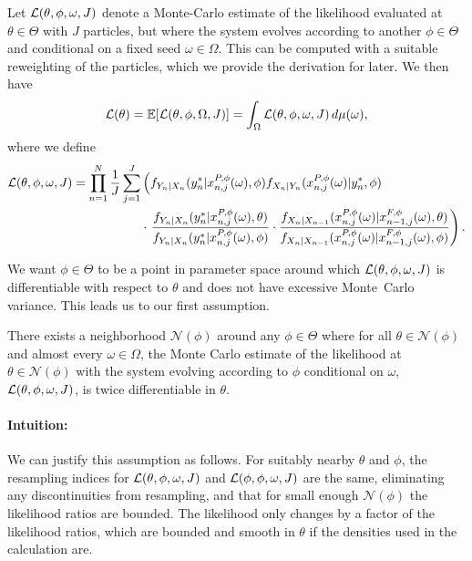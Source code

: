 \documentclass{article}
\begin{document}
\begin{defn}
\label{defn:doubly-off-policy}
Let $\mathcal{L}(\theta, \phi, \omega, J)$ denote a Monte-Carlo estimate of the likelihood evaluated at $\theta \in \Theta$ with $J$ particles, but where the system evolves according to another $\phi \in \Theta$ and conditional on a fixed seed $\omega \in \Omega$. This can be computed with a suitable reweighting of the particles, which we provide the derivation for later. We then have
\begin{equation} \label{eq:loglik2}
\mathcal{L}(\theta)=\mathbb{E}[\mathcal{L}(\theta,\phi,\Omega, J)]=\int_\Omega \mathcal{L}(\theta,\phi,\omega, J)\, d\mu(\omega),
\end{equation}
where we define
\begin{align}
    \mathcal{L}(\theta,\phi,\omega, J) = \prod_{n=1}^N \frac{1}{J} \sum_{j=1}^J &\left(f_{Y_n|X_n}(y_n^* | x_{n,j}^{P,\phi}(\omega), \phi) f_{X_n|Y_n}(x_{n,j}^{P, \phi}(\omega) | y_n^*, \phi) \right.\\
    &\cdot
    \left.
    \frac{f_{Y_n|X_n}(y^*_n|x_{n,j}^{P,\phi}(\omega),\theta)}{f_{Y_n|X_n}(y^*_n|x_{n,j}^{P,\phi}(\omega),\phi)}
    \cdot \frac{f_{X_n|X_{n-1}}(x_{n,j}^{P,\phi}(\omega)|x_{n-1,j}^{F,\phi}(\omega),\theta)}{f_{X_n|X_{n-1}}(x_{n,j}^{P,\phi}(\omega)|x_{n-1,j}^{F,\phi}(\omega),\phi)}\right).
\end{align}
\end{defn}

We want $\phi\in\Theta$ to be a point in parameter space around which $\mathcal{L}(\theta,\phi,\omega, J)$ is differentiable with respect to $\theta$ and does not have excessive Monte~Carlo variance. This leads us to our first assumption.

\begin{aspt}
\label{assump:smooth-nbhd}
There exists a neighborhood $\mathcal{N}(\phi)$ around any $\phi \in \Theta$ where for all $\theta \in \mathcal{N}(\phi)$ and almost every $\omega \in \Omega$, the Monte Carlo estimate of the likelihood at $\theta \in \mathcal{N}(\phi)$ with the system evolving according to $\phi$ conditional on $\omega$, $\mathcal{L}(\theta,\phi,\omega, J)$, is twice differentiable in $\theta$. 
\end{aspt}

\paragraph{Intuition:} We can justify this assumption as follows. For suitably nearby $\theta$ and $\phi$, the resampling indices for $\mathcal{L}(\theta,\phi,\omega, J)$ and $\mathcal{L}(\phi,\phi,\omega, J)$ are the same, eliminating any discontinuities from resampling, and that for small enough $\mathcal{N}(\phi)$ the likelihood ratios are bounded. The likelihood only changes by a factor of the likelihood ratios, which are bounded and smooth in $\theta$ if the densities used in the calculation are. 
\end{document}
